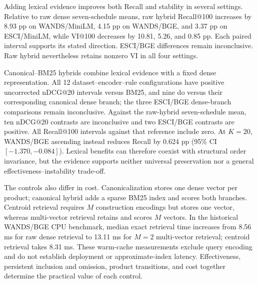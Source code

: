 Adding lexical evidence improves both Recall and stability in several settings. Relative to raw dense seven-schedule means, raw hybrid Recall@100 increases by 8.93 pp on WANDS/MiniLM, 4.15 pp on WANDS/BGE, and 3.37 pp on ESCI/MiniLM, while VI@100 decreases by 10.81, 5.26, and 0.85 pp. Each paired interval supports its stated direction. ESCI/BGE differences remain inconclusive. Raw hybrid nevertheless retains nonzero VI in all four settings.

Canonical--BM25 hybrids combine lexical evidence with a fixed dense representation. All 12 dataset--encoder--rule configurations have positive uncorrected nDCG@20 intervals versus BM25, and nine do versus their corresponding canonical dense branch; the three ESCI/BGE dense-branch comparisons remain inconclusive. Against the raw-hybrid seven-schedule mean, ten nDCG@20 contrasts are inconclusive and two ESCI/BGE contrasts are positive. All Recall@100 intervals against that reference include zero. At $K=20$, WANDS/BGE ascending instead reduces Recall by 0.624 pp (95\% CI $[-1.370,-0.084]$). Lexical benefits can therefore coexist with structural order invariance, but the evidence supports neither universal preservation nor a general effectiveness--instability trade-off.

The controls also differ in cost. Canonicalization stores one dense vector per product; canonical hybrid adds a sparse BM25 index and scores both branches. Centroid retrieval requires $M$ construction encodings but stores one vector, whereas multi-vector retrieval retains and scores $M$ vectors. In the historical WANDS/BGE CPU benchmark, median exact retrieval time increases from 8.56 ms for raw dense retrieval to 13.11 ms for $M=2$ multi-vector retrieval; centroid retrieval takes 8.31 ms. These warm-cache measurements exclude query encoding and do not establish deployment or approximate-index latency. Effectiveness, persistent inclusion and omission, product transitions, and cost together determine the practical value of each control.

